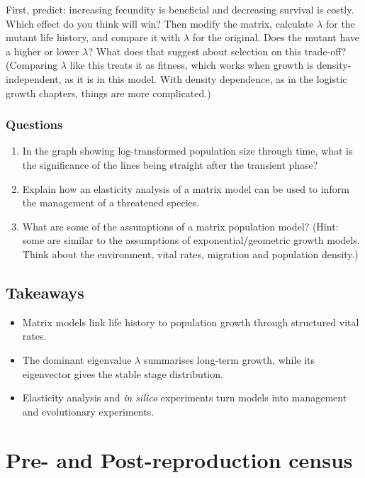 \documentclass[
  a4paper]{book}
\providecommand{\tightlist}{%
  \setlength{\itemsep}{0pt}\setlength{\parskip}{0pt}}
\begin{document}
First, predict: increasing fecundity is beneficial and decreasing survival is costly. Which effect do you think will win? Then modify the matrix, calculate \(\lambda\) for the mutant life history, and compare it with \(\lambda\) for the original. Does the mutant have a higher or lower \(\lambda\)? What does that suggest about selection on this trade-off? (Comparing \(\lambda\) like this treats it as fitness, which works when growth is density-independent, as it is in this model. With density dependence, as in the logistic growth chapters, things are more complicated.)

\subsection{Questions}\label{questions-8}

\begin{enumerate}
\def\labelenumi{\arabic{enumi}.}
\item
  In the graph showing log-transformed population size through time, what is the significance of the lines being straight after the transient phase?
\item
  Explain how an elasticity analysis of a matrix model can be used to inform the management of a threatened species.
\item
  What are some of the assumptions of a matrix population model? (Hint: some are similar to the assumptions of exponential/geometric growth models. Think about the environment, vital rates, migration and population density.)
\end{enumerate}

\section{Takeaways}\label{takeaways-8}

\begin{itemize}
\tightlist
\item
  Matrix models link life history to population growth through structured vital rates.
\item
  The dominant eigenvalue \(\lambda\) summarises long-term growth, while its eigenvector gives the stable stage distribution.
\item
  Elasticity analysis and \emph{in silico} experiments turn models into management and evolutionary experiments.
\end{itemize}

\chapter{Pre- and Post-reproduction census}\label{pre--and-post-reproduction-census}
\end{document}
